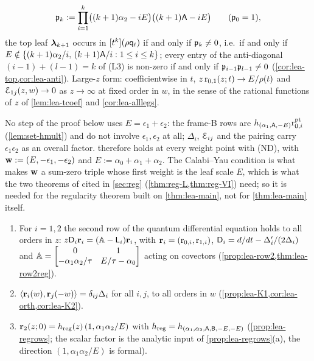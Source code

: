 \begin{thm}
\[
\mathfrak{p}_k := \prod_{i=1}^{k}\bigl((k+1)\alpha_2 - iE\bigr)\bigl((k+1)\mathsf{A} - iE\bigr)\qquad(\mathfrak{p}_0 = 1),
\]
the top leaf $\boldsymbol{\lambda}_{k+1}$ occurs in $[t^k](\rho\mathsf{q}_{t})$ if and only if $\mathfrak{p}_k\neq 0$, i.e.\ if and only if $E\notin\{(k+1)\alpha_2/i,\,(k+1)\mathsf{A}/i : 1\leq i\leq k\}$; every entry of the anti-diagonal $(i-1)+(l-1) = k$ of (L3) is non-zero if and only if $\mathfrak{p}_{i-1}\mathfrak{p}_{l-1}\neq 0$ (\cref{cor:lea-top,cor:lea-anti}). Large-$z$ form: coefficientwise in $t$, $z\,\mathrm{r}_{0,1}(z;t)\to E/\rho(t)$ and $\mathcal{E}_{1j}(z,w)\to 0$ as $z\to\infty$ at fixed order in $w$, in the sense of the rational functions of $z$ of \cref{lem:lea-tcoef} and \cref{cor:lea-alllegs}.
\end{thm}

\begin{rmk}
\label{rmk:lea-cy}
No step of the proof below uses $E = \epsilon_1+\epsilon_2$: the frame-B rows are $h_{(\alpha_1,\mathsf{A},-E)}\mathrm{r}^{\mathrm{pt}}_{0,i}$ (\cref{lem:set-hmult}) and do not involve $\epsilon_1,\epsilon_2$ at all; $\Delta_i$, $\mathcal{E}_{ij}$ and the pairing carry $\epsilon_1\epsilon_2$ as an overall factor.  therefore holds at every weight point with (ND), with $\mathbf{w} := (E,-\epsilon_1,-\epsilon_2)$ and $E := \alpha_0+\alpha_1+\alpha_2$. The Calabi--Yau condition is what makes $\mathbf{w}$ a sum-zero triple whose first weight is the leaf scale $E$, which is what the two theorems of \cite{LP2} cited in \cref{sec:reg} (\cref{thm:reg-L,thm:reg-VI}) need; so it is needed for the regularity theorem built on \cref{thm:lea-main}, not for \cref{thm:lea-main} itself.
\end{rmk}

\begin{thm}
\label{thm:lea-qde}
\begin{enumerate}
\item For $i = 1,2$ the second row of the quantum differential equation holds to all orders in $z$: $z\mathsf{D}_i\mathbf{r}_i = (\mathbb{A} - \mathsf{L}_i)\mathbf{r}_i$, with $\mathbf{r}_i = (\mathrm{r}_{0,i},\mathrm{r}_{1,i})$, $\mathsf{D}_i = d/dt - \Delta_i'/(2\Delta_i)$ and $\mathbb{A} = \begin{bmatrix}0&1\\-\alpha_1\alpha_2/\tau & E/\tau-\alpha_0\end{bmatrix}$ acting on covectors (\cref{prop:lea-row2,thm:lea-row2reg}).
\item $\langle\mathbf{r}_i(w),\mathbf{r}_j(-w)\rangle = \delta_{ij}\Delta_i$ for all $i,j$, to all orders in $w$ (\cref{prop:lea-K1,cor:lea-orth,cor:lea-K2}).
\item $\mathbf{r}_2(z;0) = h_{\mathrm{reg}}(z)\,(1,\alpha_1\alpha_2/E)$ with $h_{\mathrm{reg}} = h_{(\alpha_1,\alpha_2,\mathsf{A},\mathsf{B},-E,-E)}$ (\cref{prop:lea-regrows}; the scalar factor is the analytic input of \cref{prop:lea-regrows}(a), the direction $(1,\alpha_1\alpha_2/E)$ is formal).
\end{enumerate}
\end{thm}

